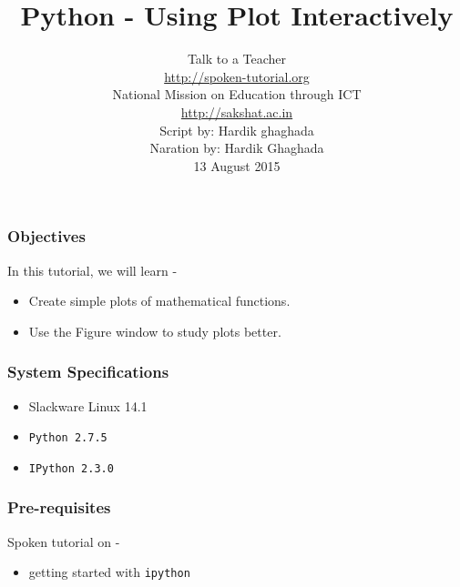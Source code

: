 \documentclass[17pt,compress]{beamer}
\author[FOSSEE]{}
\institute[IIT Bombay]{}
\date[]{}
\begin{document}
\sffamily \bfseries
\title
[Using Plot Interactively]
{Python - Using Plot Interactively}
\author
[FOSSEE, IIT - Bombay]
{\small Talk to a Teacher\\{\color{blue}\url{http://spoken-tutorial.org}}\\National Mission on Education
 through ICT\\{\color{blue}\url{http://sakshat.ac.in}} \\[0.5cm]{\tiny Script by: Hardik ghaghada \\ Naration by: Hardik Ghaghada \\ 13 August 2015}}

\begin{frame}
   \titlepage
\end{frame}
\begin{frame}
\frametitle{Objectives}
\label{sec-2}
In this tutorial, we will learn -\pause
\begin{itemize}
\item Create simple plots of mathematical functions. \pause
\item Use the Figure window to study plots better.
\end{itemize}
\end{frame}
\begin{frame}
\frametitle{System Specifications}\pause
\begin{itemize}
\item Slackware Linux 14.1\pause
\item \texttt{Python 2.7.5} \pause
\item \texttt{IPython 2.3.0}
\end{itemize}
\end{frame}
\begin{frame}
\frametitle{Pre-requisites}
Spoken tutorial on -
\begin{itemize}
\item  getting started with \texttt{ipython~}
\end{itemize}
\end{frame}
\end{document}
